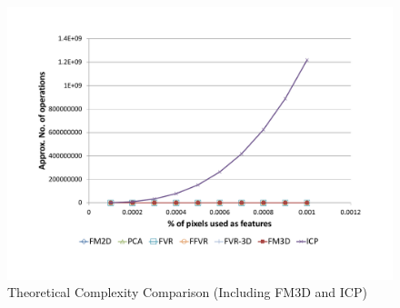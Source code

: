 \begin{figure}
        \centering
        \includegraphics[width=5.0in]{images/theoreticalSpeedComparisonAll}
        \caption{Theoretical Complexity Comparison (Including FM3D and ICP)}
        \label{fig:COMPLEX_COMP_CHART_ALL}
\end{figure}
